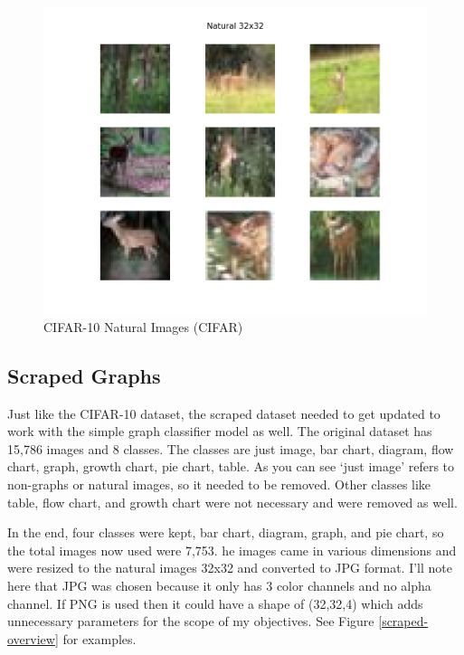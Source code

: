 \documentclass[12pt]{article}
\begin{document}
            \begin{figure}[ht]
            
                \begin{center}

                    \includegraphics[scale=0.6]{natural_overview.png}
                    \caption{CIFAR-10 Natural Images (CIFAR) \cite{krizhevsky2009}}
                    \label{cifar-overview}
        
                \end{center}
                
            \end{figure}

            
        \subsection{Scraped Graphs}
    
            Just like the CIFAR-10 dataset, the scraped dataset \cite{sunedition2021} needed to get updated to work 
            with the simple graph classifier model as well. The original dataset has 15,786 images and 8 classes. 
            The classes are just image, bar chart, diagram, flow chart, graph, growth chart, pie chart, table. 
            As you can see ‘just image’ refers to non-graphs or natural images, so it needed to be removed. 
            Other classes like table, flow chart, and growth chart were not necessary and were removed as well.

            In the end, four classes were kept, bar chart, diagram, graph, and pie chart, 
            so the total images now used were 7,753. 
            he images came in various dimensions and were resized to the natural images 32x32 and converted to JPG format. 
            I’ll note here that JPG was chosen because it only has 3 color channels and no alpha channel. 
            If PNG is used then it could have a shape of (32,32,4) which adds unnecessary parameters for the scope of my objectives.
            See Figure \ref{scraped-overview} for examples.
            
\end{document}
